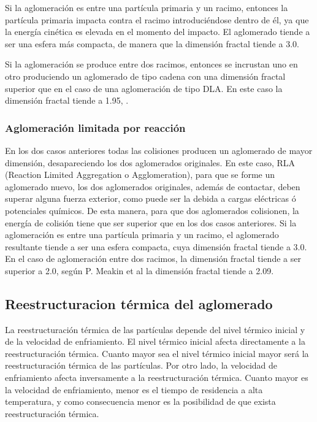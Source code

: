 \par Si la aglomeración es entre una partícula primaria y un racimo, entonces la partícula primaria impacta contra el racimo introduciéndose dentro de él, ya que la energía cinética es elevada en el momento del impacto. El aglomerado tiende a ser una esfera más compacta, de manera que la dimensión fractal tiende a 3.0. 

\par Si la aglomeración se produce entre dos racimos, entonces se incrustan uno en otro produciendo un aglomerado de tipo cadena con una dimensión fractal superior que en el caso de una aglomeración de tipo DLA. En este caso la dimensión fractal tiende a 1.95, \cite{megaridisetal:1990}.

\subsubsection{Aglomeración limitada por reacción}

\par En los dos casos anteriores todas las colisiones producen un aglomerado de mayor dimensión, desapareciendo los dos aglomerados originales. En este caso, RLA (Reaction Limited Aggregation o Agglomeration), para que se forme un aglomerado nuevo, los dos aglomerados originales, además de contactar, deben superar alguna fuerza exterior, como puede ser la debida a cargas eléctricas ó potenciales químicos. De esta manera, para que dos aglomerados colisionen, la energía de colisión tiene que ser superior que en los dos casos anteriores. Si la aglomeración es entre una partícula primaria y un racimo, el aglomerado resultante tiende a ser una esfera compacta, cuya dimensión fractal tiende a 3.0. En el caso de aglomeración entre dos racimos, la dimensión fractal tiende a ser superior a 2.0, según P. Meakin et al \cite{meakinetal:1989} la dimensión fractal tiende a 2.09.

\subsection{Reestructuracion térmica del aglomerado}

\par La reestructuración térmica de las partículas depende del nivel térmico inicial y de la velocidad de enfriamiento. El nivel térmico inicial afecta directamente a la reestructuración térmica. Cuanto mayor sea el nivel térmico inicial mayor será la reestructuración térmica de las partículas. Por otro lado, la velocidad de enfriamiento afecta inversamente a la reestructuración térmica. Cuanto mayor es la velocidad de enfriamiento, menor es el tiempo de residencia a alta temperatura, y como consecuencia menor es la posibilidad de que exista reestructuración térmica.

